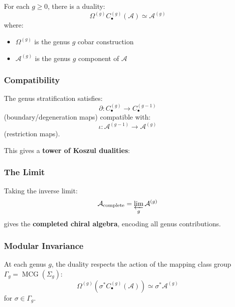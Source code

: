 For each $g \geq 0$, there is a duality:
$$\Omega^{(g)} C_{\bullet}^{(g)}(\mathcal{A}) \simeq \mathcal{A}^{(g)}$$
where:
\begin{itemize}
\item $\Omega^{(g)}$ is the genus $g$ cobar construction
\item $\mathcal{A}^{(g)}$ is the genus $g$ component of $\mathcal{A}$
\end{itemize}

\subsubsection{Compatibility}

The genus stratification satisfies:
$$\partial: C_{\bullet}^{(g)} \to C_{\bullet}^{(g-1)}$$
(boundary/degeneration maps) compatible with:
$$\iota: \mathcal{A}^{(g-1)} \to \mathcal{A}^{(g)}$$
(restriction maps).

This gives a \textbf{tower of Koszul dualities}:
\begin{center}
\end{center}

\subsubsection{The Limit}

Taking the inverse limit:
$$\mathcal{A}_{\text{complete}} = \varprojlim_g \mathcal{A}^{(g)}$$
gives the \textbf{completed chiral algebra}, encoding all genus contributions.

\subsubsection{Modular Invariance}

At each genus $g$, the duality respects the action of the mapping class group $\Gamma_g = \operatorname{MCG}(\Sigma_g)$:
$$\Omega^{(g)}(\sigma^* C_{\bullet}^{(g)}(\mathcal{A})) \simeq \sigma^* \mathcal{A}^{(g)}$$
for $\sigma \in \Gamma_g$.

